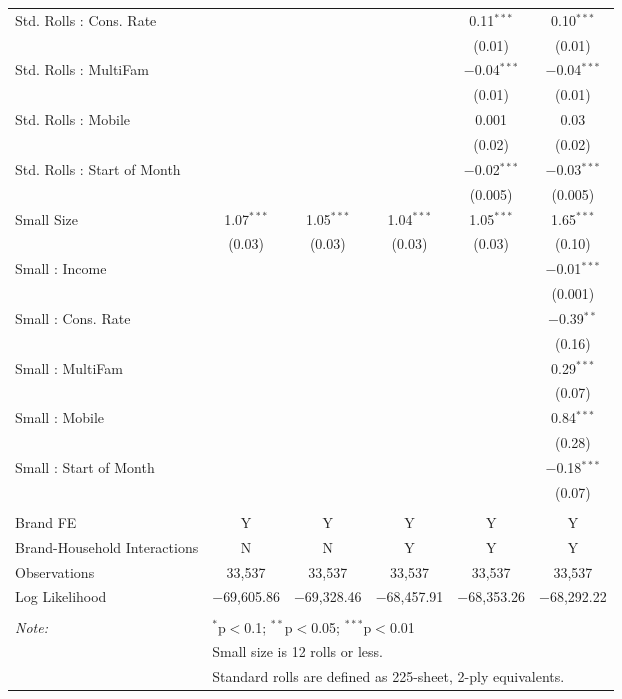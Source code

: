 \begin{table}[!htbp]
\begin{tabular}{@{\extracolsep{5pt}}lccccc}
  Std. Rolls : Cons. Rate &  &  &  & 0.11$^{***}$ & 0.10$^{***}$ \\ 
  &  &  &  & (0.01) & (0.01) \\ 
  Std. Rolls : MultiFam &  &  &  & $-$0.04$^{***}$ & $-$0.04$^{***}$ \\ 
  &  &  &  & (0.01) & (0.01) \\ 
  Std. Rolls : Mobile &  &  &  & 0.001 & 0.03 \\ 
  &  &  &  & (0.02) & (0.02) \\ 
  Std. Rolls : Start of Month &  &  &  & $-$0.02$^{***}$ & $-$0.03$^{***}$ \\ 
  &  &  &  & (0.005) & (0.005) \\ 
  Small Size & 1.07$^{***}$ & 1.05$^{***}$ & 1.04$^{***}$ & 1.05$^{***}$ & 1.65$^{***}$ \\ 
  & (0.03) & (0.03) & (0.03) & (0.03) & (0.10) \\ 
  Small : Income &  &  &  &  & $-$0.01$^{***}$ \\ 
  &  &  &  &  & (0.001) \\ 
  Small : Cons. Rate &  &  &  &  & $-$0.39$^{**}$ \\ 
  &  &  &  &  & (0.16) \\ 
  Small : MultiFam &  &  &  &  & 0.29$^{***}$ \\ 
  &  &  &  &  & (0.07) \\ 
  Small : Mobile &  &  &  &  & 0.84$^{***}$ \\ 
  &  &  &  &  & (0.28) \\ 
  Small : Start of Month &  &  &  &  & $-$0.18$^{***}$ \\ 
  &  &  &  &  & (0.07) \\ 
 \hline \\[-1.8ex] 
Brand FE & Y & Y & Y & Y & Y \\ 
Brand-Household Interactions & N & N & Y & Y & Y \\ 
Observations & 33,537 & 33,537 & 33,537 & 33,537 & 33,537 \\ 
Log Likelihood & $-$69,605.86 & $-$69,328.46 & $-$68,457.91 & $-$68,353.26 & $-$68,292.22 \\ 
\hline 
\hline \\[-1.8ex] 
\textit{Note:}  & \multicolumn{5}{l}{$^{*}$p$<$0.1; $^{**}$p$<$0.05; $^{***}$p$<$0.01} \\ 
 & \multicolumn{5}{l}{Small size is 12 rolls or less.} \\ 
 & \multicolumn{5}{l}{Standard rolls are defined as 225-sheet, 2-ply equivalents.} \\ 
\end{tabular} 
\end{table} 
